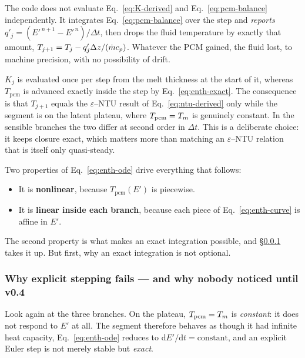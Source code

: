 \begin{description}[leftmargin=1.9em,itemsep=3pt]
\item[Closure is structural.] The code does not evaluate
  Eq.~\eqref{eq:K-derived} and Eq.~\eqref{eq:pcm-balance} independently. It
  integrates Eq.~\eqref{eq:pcm-balance} over the step and \emph{reports}
  $q'_{j}=(E'^{\,n+1}-E'^{\,n})/\Delta t$, then drops the fluid temperature by
  exactly that amount, $T_{j+1}=T_{j}-q'_{j}\Delta z/(\dot m c_{p})$. Whatever the
  PCM gained, the fluid lost, to machine precision, with no possibility of
  drift.
\item[$K$ is frozen over a time step, $T_{\mathrm{pcm}}$ is not.] $K_{j}$ is
  evaluated once per step from the melt thickness at the start of it, whereas
  $T_{\mathrm{pcm}}$ is advanced exactly inside the step by
  Eq.~\eqref{eq:enth-exact}. The consequence is that $T_{j+1}$ equals the
  $\varepsilon$--NTU result of Eq.~\eqref{eq:ntu-derived} only while the segment
  is on the latent plateau, where $T_{\mathrm{pcm}}=T_{m}$ is genuinely constant.
  In the sensible branches the two differ at second order in $\Delta t$. This
  is a deliberate choice: it keeps closure exact, which matters more than
  matching an $\varepsilon$--NTU relation that is itself only quasi-steady.
\end{description}

Two properties of Eq.~\eqref{eq:enth-ode} drive everything that follows:

\begin{itemize}[leftmargin=1.5em,itemsep=2pt]
\item It is \textbf{nonlinear}, because $T_{\mathrm{pcm}}(E')$ is piecewise.
\item It is \textbf{linear inside each branch}, because each piece of
  Eq.~\eqref{eq:enth-curve} is affine in $E'$.
\end{itemize}

\noindent
The second property is what makes an exact integration possible, and
\S\ref{sec:front:integration} takes it up. But first, why an exact integration
is not optional.

\subsubsection{Why explicit stepping fails --- and why nobody noticed until v0.4}
\label{sec:front:integration}

Look again at the three branches. On the plateau, $T_{\mathrm{pcm}}=T_{m}$ is
\emph{constant}: it does not respond to $E'$ at all. The segment therefore
behaves as though it had infinite heat capacity, Eq.~\eqref{eq:enth-ode} reduces
to $\mathrm{d}E'/\mathrm{d}t = \text{constant}$, and an explicit Euler step is
not merely stable but \emph{exact}.

